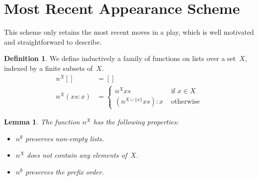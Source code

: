 \documentclass{article}
\theoremstyle{plain}
\newtheorem{lemma}[theorem]{Lemma}
\theoremstyle{definition}
\newtheorem{definition}[theorem]{Definition}
\theoremstyle{remark}
\numberwithin{theorem}{section}
\begin{document}
\section{Most Recent Appearance Scheme}
This scheme only retains the most recent moves in a play, which is well motivated and straightforward to describe.
\begin{definition}
We define inductively a family of functions on lists over a set~$X$, indexed by a finite subsets of~$X$.
\begin{align*}
    n^X [] &= []\\
    n^X (xs:x) &= 
    \begin{cases}
    n^X xs &\mbox{ if } x \in X\\
    (n^{X \cup \{ x \} }xs) : x &\mbox{ otherwise}
    \end{cases}
\end{align*}
\end{definition}
\begin{lemma}
The function $n^X$ has the following properties:
\begin{itemize}
    \item $n^\emptyset$ preserves non-empty lists.
    \item $n^X$ does not contain any elements of~$X$.
    \item $n^\emptyset$ preserves the prefix order.
\end{itemize}
\end{lemma}
\end{document}
